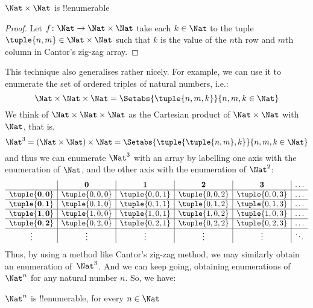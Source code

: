 \documentclass[../../../include/open-logic-section]{subfiles}
\begin{document}
\begin{prop}
	$\Nat \times \Nat$ is !!{enumerable}
\end{prop}
\begin{proof}
	Let $f \colon \Nat \to \Nat\times\Nat$ take each $k \in \Nat$ to the tuple $\tuple{n,m} \in \Nat \times \Nat$ such that $k$ is the value of the $n$th row and $m$th column in Cantor's zig-zag array. 
\end{proof}
\begin{explain}
This technique also generalises rather nicely. For example, we can use it to enumerate the set of ordered triples
of natural numbers, i.e.:
\[
\Nat \times \Nat \times \Nat = \Setabs{\tuple{n,m,k}}{n,m,k \in \Nat}
\]
We think of $\Nat \times \Nat \times \Nat$ as the Cartesian
product of $\Nat \times \Nat$ with $\Nat$, that is,
\[
\Nat^3 = (\Nat \times \Nat) \times \Nat =
\Setabs{\tuple{\tuple{n,m},k}}{n, m, k
  \in \Nat }
\]
and thus we can enumerate $\Nat^3$ with an array by labelling one
axis with the enumeration of $\Nat$, and the other axis with the
enumeration of $\Nat^2$:
\[
\begin{array}{ c | c | c | c | c | c}
& \textbf 0 & \textbf 1 & \textbf 2 & \textbf 3 & \dots \\
\hline
\mathbf{\tuple{0,0}} & \tuple{0,0,0} & \tuple{0,0,1} & \tuple{0,0,2} & \tuple{0,0,3} & \dots \\
\hline
\mathbf{\tuple{0,1}} & \tuple{0,1,0} & \tuple{0,1,1} & \tuple{0,1,2} & \tuple{0,1,3} & \dots \\
\hline
\mathbf{\tuple{1,0}} & \tuple{1,0,0} & \tuple{1,0,1} & \tuple{1,0,2} & \tuple{1,0,3} & \dots \\
\hline
\mathbf{\tuple{0,2}} & \tuple{0,2,0} & \tuple{0,2,1} & \tuple{0,2,2} & \tuple{0,2,3} & \dots\\
\hline
\vdots & \vdots & \vdots & \vdots & \vdots & \ddots \\
\end{array}
\]
Thus, by using a method like Cantor's zig-zag method, we may
similarly obtain an enumeration of~$\Nat^3$. And we can keep going, obtaining enumerations of $\Nat^n$ for any natural number $n$. So, we have:
\end{explain}
\begin{prop}
	$\Nat^n$ is !!{enumerable}, for every $n \in \Nat$
\end{prop}
\end{document}
